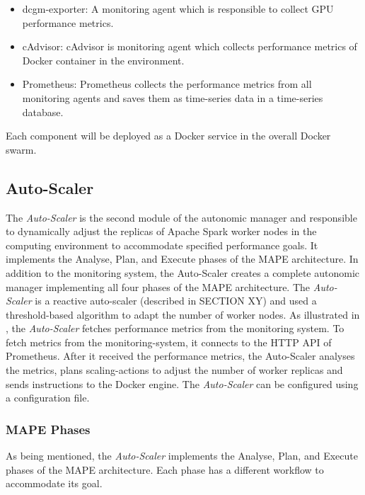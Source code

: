 \begin{itemize}
\item dcgm-exporter: A monitoring agent which is responsible to collect GPU performance metrics.
\item cAdvisor: cAdvisor is monitoring agent which collects performance metrics of Docker container in the environment.
\item Prometheus: Prometheus collects the performance metrics from all monitoring agents and saves them as time-series data in a time-series database.
\end{itemize}
Each component will be deployed as a Docker service in the overall Docker swarm.


\subsection{Auto-Scaler}
The \textit{Auto-Scaler} is the second module of the autonomic manager and responsible to dynamically adjust the replicas of Apache Spark worker nodes in the computing environment to accommodate specified performance goals.
It implements the Analyse, Plan, and Execute phases of the MAPE architecture.
In addition to the monitoring system, the Auto-Scaler creates a complete autonomic manager implementing all four phases of the MAPE architecture.
The \textit{Auto-Scaler} is a reactive auto-scaler (described in SECTION XY) and used a threshold-based algorithm to adapt the number of worker nodes.
As illustrated in , the \textit{Auto-Scaler} fetches performance metrics from the monitoring system.
To fetch metrics from the monitoring-system, it connects to the HTTP API of Prometheus.
After it received the performance metrics, the Auto-Scaler analyses the metrics, plans scaling-actions to adjust the number of worker replicas and sends instructions to the Docker engine.
The \textit{Auto-Scaler} can be configured using a configuration file.


\subsubsection{MAPE Phases}
As being mentioned, the \textit{Auto-Scaler} implements the Analyse, Plan, and Execute phases of the MAPE architecture. Each phase has a different workflow to accommodate its goal.

